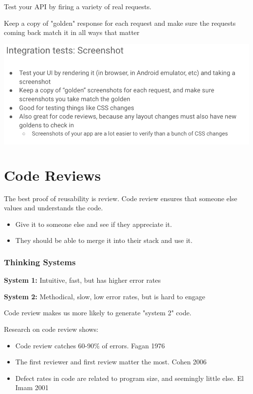 \documentclass{article}
\begin{document}
Test your API by firing a variety of real requests.

Keep a copy of "golden" response for each request and make sure the requests coming back match it in all ways that matter

\includegraphics*[width=\linewidth]{integrationScreenshot.png}

\pagebreak

\section{Code Reviews}

The best proof of reusability is review. Code review ensures that someone else values and understands the code.

\begin{itemize}
    \item Give it to someone else and see if they appreciate it.
    \item They should be able to merge it into their stack and use it.
\end{itemize}

\subsubsection*{Thinking Systems}
\textbf{System 1:} Intuitive, fast, but has higher error rates

\textbf{System 2:} Methodical, slow, low error rates, but is hard to engage

\vspace*{1em}

Code review makes us more likely to generate "system 2" code.

\vspace*{1em}

Research on code review shows:
\begin{itemize}
    \item Code review catches 60-90\% of errors. Fagan 1976
    \item The first reviewer and first review matter the most. Cohen 2006
    \item Defect rates in code are related to program size, and seemingly little else. El Imam 2001
\end{itemize}
\end{document}
